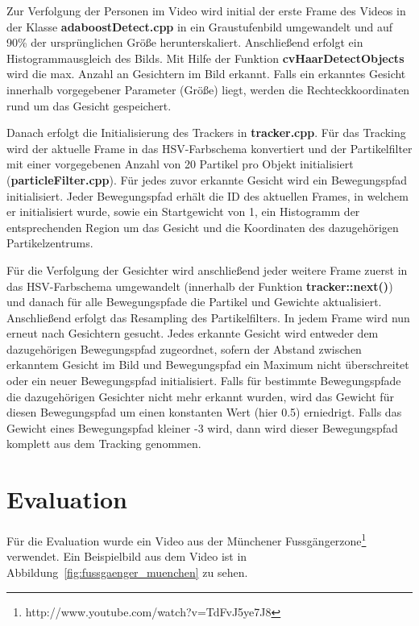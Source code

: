 \documentclass[a4paper, 11pt, twocolumn]{article}
\begin{document}
Zur Verfolgung der Personen im Video wird initial der erste Frame des Videos in der Klasse \textbf{adaboostDetect.cpp} in ein Graustufenbild umgewandelt und auf 90\% der ursprünglichen Größe herunterskaliert. Anschließend erfolgt ein Histogrammausgleich des Bilds. Mit Hilfe der Funktion \textbf{cvHaarDetectObjects} wird die max. Anzahl an Gesichtern im Bild erkannt. Falls ein erkanntes Gesicht innerhalb vorgegebener Parameter (Größe) liegt, werden die Rechteckkoordinaten rund um das Gesicht gespeichert.

Danach erfolgt die Initialisierung des Trackers in \textbf{tracker.cpp}. Für das Tracking wird der aktuelle Frame in das HSV-Farbschema konvertiert und der Partikelfilter mit einer vorgegebenen Anzahl von 20 Partikel pro Objekt initialisiert (\textbf{particleFilter.cpp}). Für jedes zuvor erkannte Gesicht wird ein Bewegungspfad initialisiert. Jeder Bewegungspfad erhält die ID des aktuellen Frames, in welchem er initialisiert wurde, sowie ein Startgewicht von 1, ein Histogramm der entsprechenden Region um das Gesicht und die Koordinaten des dazugehörigen Partikelzentrums.

Für die Verfolgung der Gesichter wird anschließend jeder weitere Frame zuerst in das HSV-Farbschema umgewandelt (innerhalb der Funktion \textbf{tracker::next()}) und danach für alle Bewegungspfade die Partikel und Gewichte aktualisiert. Anschließend erfolgt das Resampling des Partikelfilters. In jedem Frame wird nun erneut nach Gesichtern gesucht. Jedes erkannte Gesicht wird entweder dem dazugehörigen Bewegungspfad zugeordnet, sofern der Abstand zwischen erkanntem Gesicht im Bild und Bewegungspfad ein Maximum nicht überschreitet oder ein neuer Bewegungspfad initialisiert. Falls für bestimmte Bewegungspfade die dazugehörigen Gesichter nicht mehr erkannt wurden, wird das Gewicht für diesen Bewegungspfad um einen konstanten Wert (hier 0.5) erniedrigt. Falls das Gewicht eines Bewegungspfad kleiner -3 wird, dann wird dieser Bewegungspfad komplett aus dem Tracking genommen.


\section{Evaluation} %
\label{sec:evaluation}

Für die Evaluation wurde ein Video aus der Münchener Fussgängerzone\footnote{http://www.youtube.com/watch?v=TdFvJ5ye7J8} verwendet. Ein Beispielbild aus dem Video ist in Abbildung~\ref{fig:fussgaenger_muenchen} zu sehen.
\end{document}
